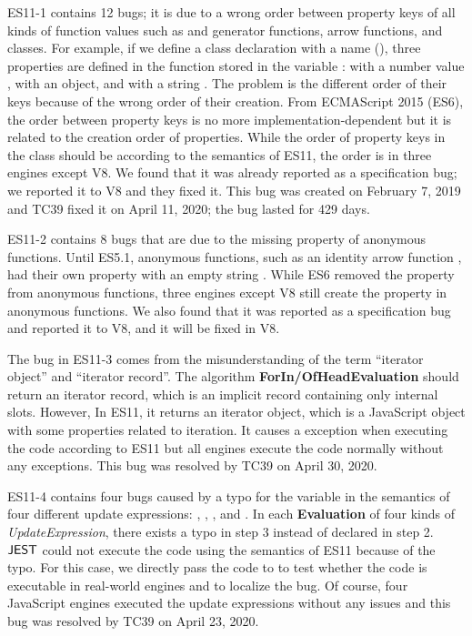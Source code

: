 ES11-1 contains 12 bugs; it is due to a wrong order between property keys of all kinds of
function values such as  and generator functions, arrow functions, and classes.
For example, if we define a class declaration with a name 
(), three properties are defined in the function
stored in the variable :  with a number value ,
 with an object, and  with a string .
The problem is the different order of their keys because of
the wrong order of their creation.
From ECMAScript 2015 (ES6), the order between property keys is no
more implementation-dependent but it is related to the creation order of properties.
While the order of property keys in the class  should be 
according to the semantics of ES11, the order is 
in three engines except V8.  We found that it was already reported as a specification bug;
we reported it to V8 and they fixed it.
This bug was created on February 7, 2019 and TC39 fixed it on April 11, 2020;
the bug lasted for 429 days.

ES11-2 contains 8 bugs that are due to the missing property
 of anonymous functions.  Until ES5.1, anonymous functions, such as an identity arrow
function , had their own property  with an empty string .
While ES6 removed the  property from anonymous functions,
three engines except V8 still create the  property in anonymous functions.
We also found that it was reported as a specification bug and reported it
to V8, and it will be fixed in V8.

The bug in ES11-3 comes from the misunderstanding of the term ``iterator
object'' and ``iterator record''.  The algorithm \textbf{ForIn/OfHeadEvaluation}
should return an iterator record, which is an implicit record containing only internal slots.
However, In ES11, it returns an iterator object, which is a
JavaScript object with some properties related to iteration.
It causes a  exception when executing the code  according to
ES11 but all engines execute the code normally without any exceptions.
This bug was resolved by TC39 on April 30, 2020.

ES11-4 contains four bugs caused by a typo for the variable in the
semantics of four different update expressions: , ,
, and .  In each \textbf{Evaluation} of four kinds of
\textit{UpdateExpression}, there exists a typo  in step 3
instead of  declared in step 2.  $\tool$ could not execute
the code  using the semantics of ES11 because of the typo.
For this case, we directly pass the code to  to test whether the
code is executable in real-world engines and to localize the bug.
Of course, four JavaScript engines executed the update expressions without any issues
and this bug was resolved by TC39 on April 23, 2020.

